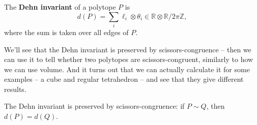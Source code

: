 \begin{definition}
    The \textbf{Dehn invariant} of a polytope $P$ is \[d(P) = \sum_i \ell_i \otimes \theta_i \in \mathbb{R} \otimes \mathbb{R}/2\pi\mathbb{Z},\] where the sum is taken over all edges of $P$.  
\end{definition}

We'll see that the Dehn invariant is preserved by scissors-congruence -- then we can use it to tell whether two polytopes are scissors-congruent, similarly to how we can use volume. And it turns out that we can actually calculate it for some examples -- a cube and regular tetrahedron -- and see that they give different results. 

\begin{theorem}
    The Dehn invariant is preserved by scissors-congruence: if $P \sim Q$, then $d(P) = d(Q)$.
\end{theorem}

